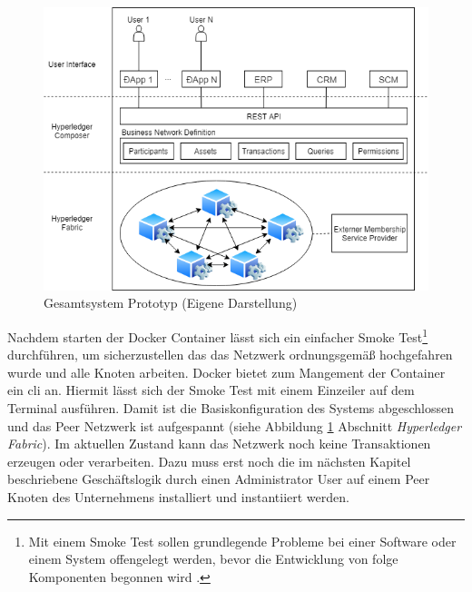 \begin{figure}[H]
	\centering
	\includegraphics[width=1\linewidth]{pictures/poc-food-chain-traceability}
	\caption[Gesamtsystem Prototyp]{Gesamtsystem Prototyp (Eigene Darstellung)}
	\label{fig:poc-food-chain-traceability}
\end{figure}

Nachdem starten der Docker Container lässt sich ein einfacher Smoke Test\footnote{Mit einem Smoke Test sollen grundlegende Probleme bei einer Software oder einem System offengelegt werden, bevor die Entwicklung von folge Komponenten begonnen wird \citep{Everett2007}.} durchführen, um sicherzustellen das das Netzwerk ordnungsgemäß hochgefahren wurde und alle Knoten arbeiten. Docker bietet zum Mangement der Container ein \ac{cli} an. Hiermit lässt sich der Smoke Test mit einem Einzeiler auf dem Terminal ausführen. Damit ist die Basiskonfiguration des Systems abgeschlossen und das Peer Netzwerk ist aufgespannt (siehe Abbildung \ref{fig:poc-food-chain-traceability} Abschnitt \textit{Hyperledger Fabric}). Im aktuellen Zustand kann das Netzwerk noch keine Transaktionen erzeugen oder verarbeiten. Dazu muss erst noch die im nächsten Kapitel beschriebene Geschäftslogik durch einen Administrator User auf einem Peer Knoten des Unternehmens installiert und instantiiert werden.

